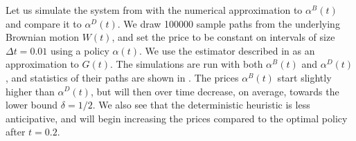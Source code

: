 \documentclass[main.tex]{subfiles}
\begin{document}
\begin{example}\label{ex:impact_uncertainty}
  Let us simulate the system from
  with the numerical approximation to $\alpha^B(t)$ and compare it to $\alpha^D(t)$.
  We draw \num{100000} sample paths from the underlying Brownian
  motion $W(t)$, and set the price to be constant on intervals of size $\Delta t = 0.01$
  using a policy $\alpha(t)$. We use the estimator described in
   as an approximation to $G(t)$.
  The simulations are run with both $\alpha^B(t)$ and $\alpha^D(t)$, and
  statistics of their paths are shown in .
  The prices $\alpha^B(t)$ start slightly higher than $\alpha^D(t)$, but
  will then over time decrease, on average, towards the lower bound
  $\delta=1/2$. We also see that the deterministic heuristic is less
  anticipative, and will begin increasing the prices compared to the
  optimal policy after $t=0.2$.


\end{example}
\end{document}
